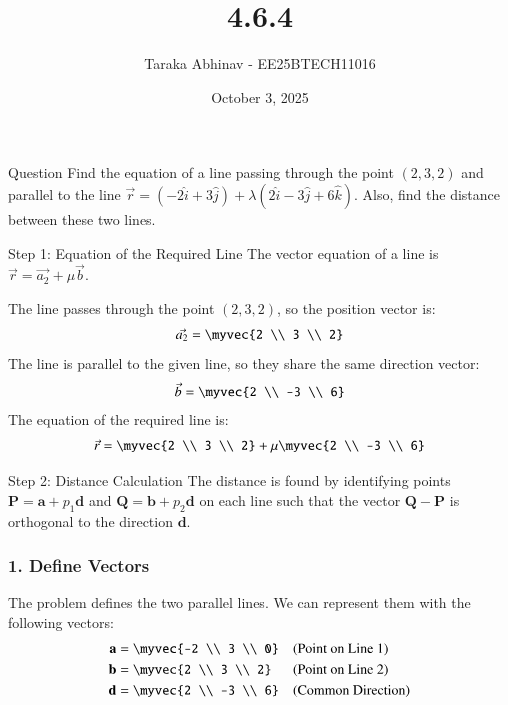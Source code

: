 \documentclass{beamer}
\newcommand{\mat}[1]{\mathbf{#1}}
\begin{document}
\title
{4.6.4}
\date{October 3, 2025}

\author
{Taraka Abhinav - EE25BTECH11016}

\frame{\titlepage}

\begin{frame}{Question}
Find the equation of a line passing through the point $(2, 3, 2)$ and parallel to the line $\vec{r} = (-2\hat{i} + 3\hat{j}) + \lambda(2\hat{i} - 3\hat{j} + 6\hat{k})$. Also, find the distance between these two lines.
\end{frame}

\begin{frame}{Step 1: Equation of the Required Line}
The vector equation of a line is $\vec{r} = \vec{a_2} + \mu\vec{b}$.

The line passes through the point $(2, 3, 2)$, so the position vector is:
\begin{align}
    \vec{a_2} = \myvec{2 \\ 3 \\ 2}
\end{align}
The line is parallel to the given line, so they share the same direction vector:
\begin{align}
    \vec{b} = \myvec{2 \\ -3 \\ 6}
\end{align}
The equation of the required line is:
\begin{align}
    \vec{r} = \myvec{2 \\ 3 \\ 2} + \mu\myvec{2 \\ -3 \\ 6}
\end{align}
\end{frame}

\begin{frame}{Step 2: Distance Calculation}
The distance is found by identifying points $\mat{P} = \mat{a} + p_1\mat{d}$ and $\mat{Q} = \mat{b} + p_2\mat{d}$ on each line such that the vector $\mat{Q}-\mat{P}$ is orthogonal to the direction $\mat{d}$.

\subsubsection*{1. Define Vectors}
The problem defines the two parallel lines. We can represent them with the following vectors:
\begin{align}
\mat{a} &= \myvec{-2 \\ 3 \\ 0} & & \text{(Point on Line 1)} \\
\mat{b} &= \myvec{2 \\ 3 \\ 2} & & \text{(Point on Line 2)} \\
\mat{d} &= \myvec{2 \\ -3 \\ 6} & & \text{(Common Direction)}
\end{align}
\end{frame}
\end{document}
